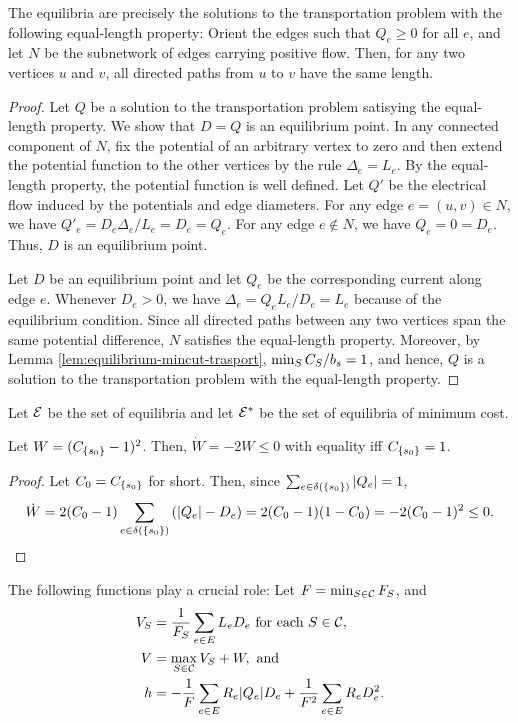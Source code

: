 \documentclass[11pt,a4paper]{article}
\newcommand{\E}{\cal E}
\newcommand{\Estar}{\E^*}
\begin{document}
\begin{lemma}\label{lem:characterization of equilibria transportation} 
The equilibria are precisely the solutions to the transportation problem with
the following equal-length property: Orient the edges such that $Q_e \ge
0$ for all $e$, and let $N$ be the subnetwork of edges carrying positive
flow. Then, for any two vertices $u$ and $v$, all directed paths from $u$ to $v$
have the same length. 
\end{lemma}
\begin{proof} Let $Q$ be a solution to the transportation problem satisying the
equal-length property. We show that $D = Q$ is an equilibrium point. In any
connected component of $N$, fix the potential of an arbitrary vertex to zero and
then extend the potential function to the other vertices by the rule $\Delta_e
= L_e$. By the equal-length property, the potential function is well
defined. Let $Q'$ be the electrical flow induced by the potentials and edge
diameters. For any 
edge $e
= (u,v) \in N$, we have $Q'_e = D_e \Delta_e/L_e = D_e = Q_e$. 
For any edge $e
\not\in N$, we have $Q_e = 0 = D_e$. Thus, $D$ is an equilibrium point. 


Let $D$ be an equilibrium point and let $Q_e$ be the corresponding current
along edge $e$. Whenever $D_e>0$, we have $\Delta_e = Q_e L_e / D_e = L_e$ because of the
equilibrium condition. Since all directed paths between any two vertices span the same
potential difference, $N$ satisfies the equal-length property. Moreover, by Lemma
\ref{lem:equilibrium-mincut-trasport}, $\min_S \capa(S)/b_s=1$, and hence, $Q$ is a
solution to the transportation problem with the equal-length property.  
\end{proof}

Let $\E$ be the set of equilibria and let $\Estar$ be the set of equilibria of
minimum cost. 

\begin{lemma}
\label{lem:monotonicity-sourcecut transportation}
Let $W = (\capa(\{s_0\})-1)^2$. Then, $\dot{W} = -2 W \le 0$ with equality iff 
$\capa(\{s_0\})=1$. 
\end{lemma}
\begin{proof} 
Let $C_0 = \capa(\{s_0\})$ for short. Then, since $\sum_{e \in \delta(\{s_0\})} | Q_e |=1$,  
\[
\dot{W} = 2(C_0 -1) \sum_{e \in \delta(\{s_0\})} \left(| Q_e | - D_e
\right) = 2(C_0 -1) (1 - C_0) = -2 (C_0 -1)^2 \le 0. \] \Lnegskip
\end{proof}

\noindent
The following functions play a crucial role: Let $F =\min_{S \in {\cal C}} F_S$, and  
\begin{align*}
V_S &= \frac{1}{F_S} \sum_{e \in E} L_e D_e \text{ for each } S \in {\cal C}, \\
V &= \max_{S \in {\cal C}} V_S + W, \text{ and }\\
h &= - \frac{1}{F} \sum_{e \in E} R_e | Q_e | D_e + \frac{1}{F^2} \sum_{e \in E} R_e D_e^2. 
\end{align*}
\end{document}

